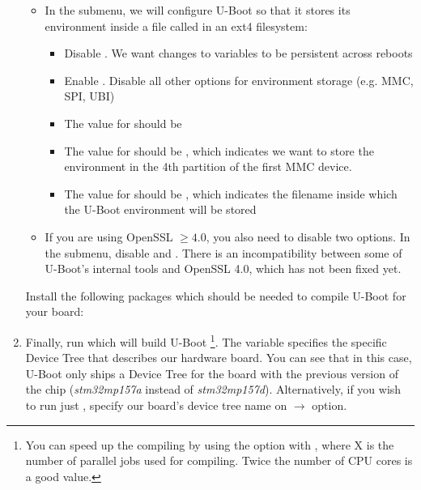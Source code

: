 \begin{enumerate}
\begin{itemize}
  \item In the  submenu, we will configure U-Boot so
    that it stores its environment inside a file called 
    in an ext4 filesystem:
    \begin{itemize}
    \item Disable . We want changes to variables to
        be persistent across reboots
    \item Enable . Disable all other
        options for environment storage (e.g. MMC, SPI, UBI)
    \item The value for  should be 
    \item The value for  should be , which indicates
      we want to store the environment in the 4th partition of the
      first MMC device.
    \item The value for  should be , which indicates the
      filename inside which the U-Boot environment will be stored
    \end{itemize}
  \item If you are using OpenSSL $\ge 4.0$, you also need to disable two options.
  In the  submenu, disable 
  and .
  There is an incompatibility between some of U-Boot's internal tools and OpenSSL 4.0,
  which has not been fixed yet.
  \end{itemize}

Install the following packages which should be needed to compile U-Boot for
your board:


\item Finally, run \bashcmd{make DEVICE_TREE=st/stm32mp157a-dk1}
  which will build U-Boot
  \footnote{You can speed up the
  compiling by using the \code{-jX} option with \code{make}, where X
  is the number of parallel jobs used for compiling. Twice the
  number of CPU cores is a good value.}.
  The  variable specifies the specific
  Device Tree that describes our hardware board.
  You can see that in this case, U-Boot
  only ships a Device Tree for the board with the previous version
  of the chip ({\em stm32mp157a} instead of {\em stm32mp157d}).
  Alternatively, if you wish to run just ,
  specify our board's device tree name on
   $\rightarrow$ 
  option.

\end{enumerate}

